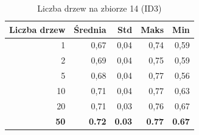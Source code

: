 \begin{table}[htbp]
\centering
\small
\setlength{\tabcolsep}{6pt}
\renewcommand{\arraystretch}{1.2}
\caption{Liczba drzew na zbiorze 14 (ID3)}
\label{tab:ID3_tree_count_14}
\begin{tabular}{r|r|r|r|r}
\toprule
Liczba drzew & Średnia & Std & Maks & Min \\
\hline
1 & 0,67 & 0,04 & 0,74 & 0,59 \\
2 & 0,69 & 0,04 & 0,75 & 0,59 \\
5 & 0,68 & 0,04 & 0,77 & 0,56 \\
10 & 0,71 & 0,04 & 0,77 & 0,63 \\
20 & 0,71 & 0,03 & 0,76 & 0,67 \\
\textbf{50} & \textbf{0.72} & \textbf{0.03} & \textbf{0.77} & \textbf{0.67} \\
\bottomrule
\end{tabular}
\end{table}
